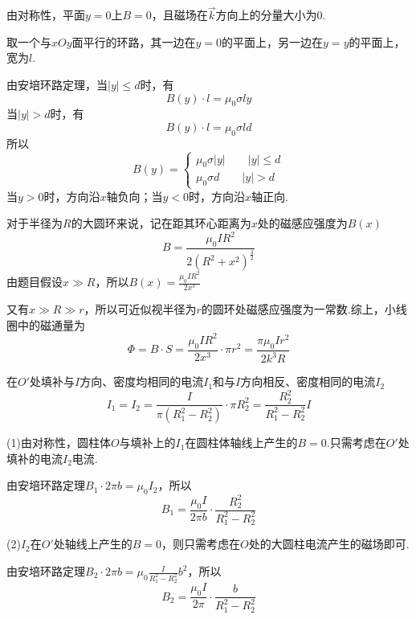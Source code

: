 \documentclass[b5paper,opensource,sourcefont,parskip]{qyxf-book}
\begin{document}
\solve 
由对称性，平面$y=0$上$B=0$，且磁场在$\vec{k}$方向上的分量大小为$0$.

取一个与$xOy$面平行的环路，其一边在$y=0$的平面上，另一边在$y=y$的平面上，宽为$l$.

由安培环路定理，当$|y|\le d$时，有
\begin{equation*}
B(y)\cdot l=\mu_0\sigma ly
\end{equation*}
当$|y|>d$时，有
\begin{equation*}
B(y)\cdot l=\mu_0\sigma ld
\end{equation*}
所以
\begin{equation*}
B(y)=
\begin{cases}
\mu_0\sigma|y|\qquad|y|\le d\\
\mu_0\sigma d\qquad|y|>d
\end{cases}
\end{equation*}
当$y>0$时，方向沿$x$轴负向；当$y<0$时，方向沿$x$轴正向.


\solve
对于半径为$R$的大圆环来说，记在距其环心距离为$x$处的磁感应强度为$B(x)$
\begin{equation*}
B=\frac{\mu_0IR^2}{2(R^2+x^2)^{\frac{3}{2}}}
\end{equation*}
由题目假设$x\gg R$，所以$B(x)=\frac{\mu_0IR^2}{2x^3}$

又有$x\gg R\gg r$，所以可近似视半径为$r$的圆环处磁感应强度为一常数.综上，小线圈中的磁通量为
\begin{equation*}
\Phi=B\cdot S=\frac{\mu_0IR^2}{2x^3}\cdot \pi r^2=\frac{\pi\mu_0Ir^2}{2k^3R}
\end{equation*}


\solve
在$O'$处填补与$I$方向、密度均相同的电流$I_1$和与$I$方向相反、密度相同的电流$I_2$
\begin{equation*}
I_1=I_2=\frac{I}{\pi (R_1^2-R_2^2)}\cdot\pi R_2^2=\frac{R_2^2}{R_1^2-R_2^2}I
\end{equation*}

(1)由对称性，圆柱体$O$与填补上的$I_1$在圆柱体轴线上产生的$B=0$.只需考虑在$O'$处填补的电流$I_2$电流.

由安培环路定理$B_1\cdot2\pi b=\mu_0I_2$，所以
\begin{equation*}
B_1=\frac{\mu_0I}{2\pi b}\cdot\frac{R_2^2}{R_1^2-R_2^2}
\end{equation*}

(2)$I_2$在$O'$处轴线上产生的$B=0$，则只需考虑在$O$处的大圆柱电流产生的磁场即可.

由安培环路定理$B_2\cdot2\pi b=\mu_0\frac{I}{R_1^2-R_2^2}b^2$，所以
\begin{equation*}
B_2=\frac{\mu_0I}{2\pi}\cdot\frac{b}{R_1^2-R_2^2}
\end{equation*}
\end{document}
